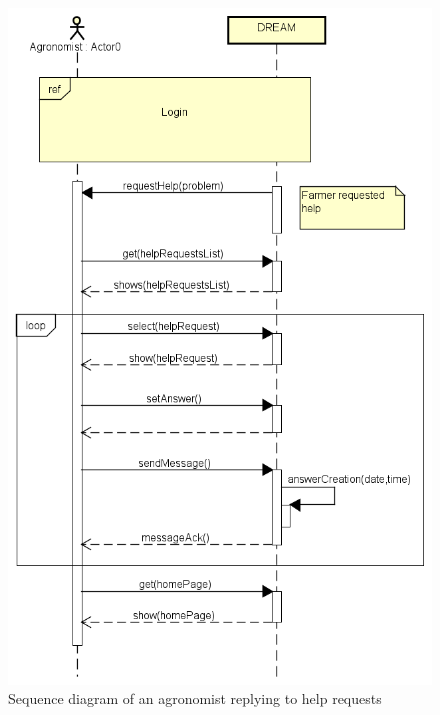 \bigskip
\begin{figure}[H]
    \centering
    \includegraphics[scale=0.7]{Images/agronomistAnswersHelpRequests.png}
    \caption{Sequence diagram of an agronomist replying to help requests}
\end{figure}


